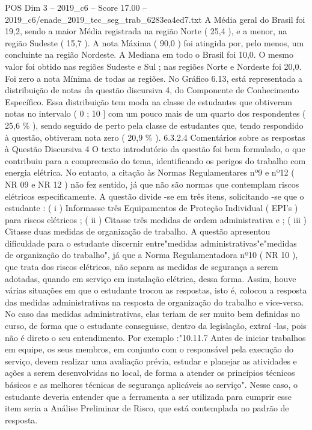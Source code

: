 \begin{textsample}{POS Dim 3 – 2019\_c6 – Score 17.00 – 2019\_c6/enade\_2019\_tec\_seg\_trab\_6283ea4ed7.txt}
A Média geral do Brasil foi 19,2, sendo a maior Média registrada na região Norte ( 25,4 ), e a menor, na região Sudeste ( 15,7 ).
A nota Máxima ( 90,0 ) foi atingida por, pelo menos, um concluinte na região Nordeste.
A Mediana em todo o Brasil foi 10,0.
O mesmo valor foi obtido nas regiões Sudeste e Sul ; nas regiões Norte e Nordeste foi 20,0.
Foi zero a nota Mínima de todas as regiões.
No Gráfico 6.13, está representada a distribuição de notas da questão discursiva 4, do Componente de Conhecimento Específico.
Essa distribuição tem moda na classe de estudantes que obtiveram notas no intervalo ( 0 ; 10 ] com um pouco mais de um quarto dos respondentes ( 25,6 \% ), sendo seguido de perto pela classe de estudantes que, tendo respondido à questão, obtiveram nota zero ( 20,9 \% ). 6.3.2.4 Comentários sobre as respostas à Questão Discursiva 4 O texto introdutório da questão foi bem formulado, o que contribuiu para a compreensão do tema, identificando os perigos do trabalho com energia elétrica.
No entanto, a citação às Normas Regulamentares nº9 e nº12 ( NR 09 e NR 12 ) não fez sentido, já que não são normas que contemplam riscos elétricos especificamente.
A questão divide -se em três itens, solicitando -se que o estudante : ( i ) Informasse três Equipamentos de Proteção Individual ( EPI's ) para riscos elétricos ; ( ii ) Citasse três medidas de ordem administrativa e ; ( iii ) Citasse duas medidas de organização de trabalho.
A questão apresentou dificuldade para o estudante discernir entre"medidas administrativas"e"medidas de organização do trabalho", já que a Norma Regulamentadora nº10 ( NR 10 ), que trata dos riscos elétricos, não separa as medidas de segurança a serem adotadas, quando em serviço em instalação elétrica, dessa forma.
Assim, houve várias situações em que o estudante trocou as respostas, isto é, colocou a resposta das medidas administrativas na resposta de organização do trabalho e vice-versa.
No caso das medidas administrativas, elas teriam de ser muito bem definidas no curso, de forma que o estudante conseguisse, dentro da legislação, extraí -las, pois não é direto o seu entendimento.
Por exemplo :"10.11.7 Antes de iniciar trabalhos em equipe, os seus membros, em conjunto com o responsável pela execução do serviço, devem realizar uma avaliação prévia, estudar e planejar as atividades e ações a serem desenvolvidas no local, de forma a atender os princípios técnicos básicos e as melhores técnicas de segurança aplicáveis ao serviço".
Nesse caso, o estudante deveria entender que a ferramenta a ser utilizada para cumprir esse item seria a Análise Preliminar de Risco, que está contemplada no padrão de resposta.

\end{textsample}
